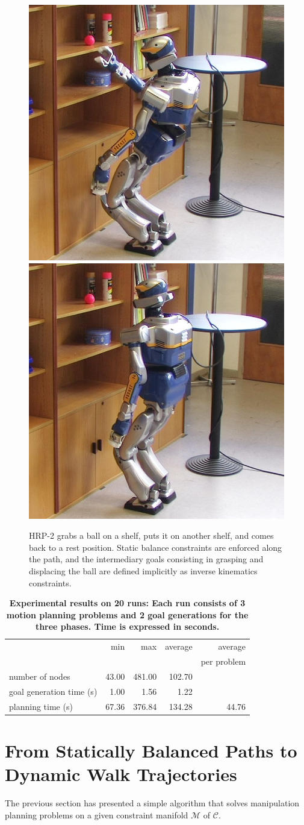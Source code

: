 \documentclass{article}
\newcommand\manifold{\mathcal{M}}
\begin{document}
\begin{figure}[h]
\includegraphics[width=0.24\linewidth]{pics/wb-shelves/7.jpg}
\includegraphics[width=0.24\linewidth]{pics/wb-shelves/8.jpg}

\caption{HRP-2 grabs a ball on a shelf, puts it on another shelf, and comes back to 
  a rest position. Static balance constraints are enforced along the path, and 
  the intermediary goals consisting in grasping and displacing the ball are defined
  implicitly as inverse kinematics constraints.}
\label{fig:wb-shelves}
\end{figure}

\begin{table}
\begin{tabular}{l|r|r|r|r|}
\cline{2-5}
& min & max & average & average \\ 
&&&& per problem \\
\hline
\multicolumn{1}{|l|}{number of nodes} & 43.00 & 481.00 & 102.70 \\
\cline{1-4}
\multicolumn{1}{|l|}{goal generation time (s)} & 1.00 & 1.56 & 1.22\\
\hline
\multicolumn{1}{|l|}{planning time (s)} & 67.36 & 376.84 & 134.28 & 44.76\\
\hline
\end{tabular}
\caption {\textbf{Experimental results on 20 runs: Each run consists
    of 3 motion planning problems and 2 goal generations for the three
    phases. Time is expressed in seconds.}}
\label{table:reaching}
\end{table}

\section{From Statically Balanced Paths to Dynamic Walk Trajectories}
\label{sec:wb-step}

The previous section has presented a simple algorithm that solves
manipulation planning problems on a given constraint manifold
$\manifold$ of $\mathcal{C}$.
\end{document}
